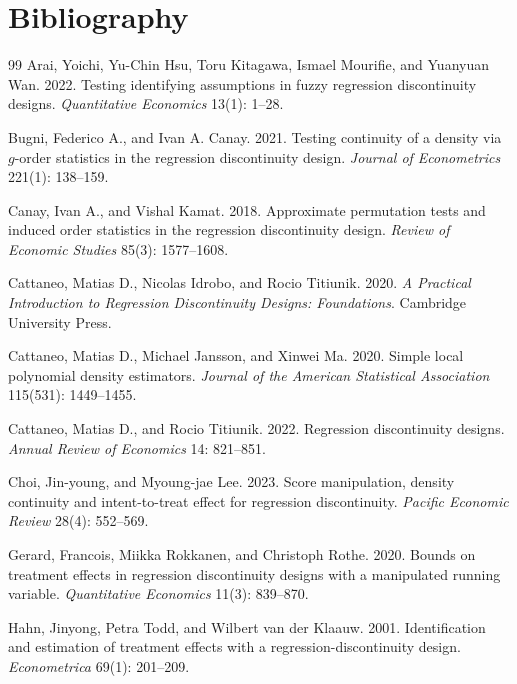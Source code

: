 \documentclass[11pt]{article}
\theoremstyle{definition}
\theoremstyle{plain}
\theoremstyle{remark}
\begin{document}
\section*{Bibliography}
\begin{thebibliography}{99}
Arai, Yoichi, Yu-Chin Hsu, Toru Kitagawa, Ismael Mourifie, and Yuanyuan Wan.
2022.
Testing identifying assumptions in fuzzy regression discontinuity designs.
\emph{Quantitative Economics} 13(1): 1--28.

Bugni, Federico A., and Ivan A. Canay.
2021.
Testing continuity of a density via \(g\)-order statistics in the regression discontinuity design.
\emph{Journal of Econometrics} 221(1): 138--159.

Canay, Ivan A., and Vishal Kamat.
2018.
Approximate permutation tests and induced order statistics in the regression discontinuity design.
\emph{Review of Economic Studies} 85(3): 1577--1608.

Cattaneo, Matias D., Nicolas Idrobo, and Rocio Titiunik.
2020.
\emph{A Practical Introduction to Regression Discontinuity Designs: Foundations}.
Cambridge University Press.

Cattaneo, Matias D., Michael Jansson, and Xinwei Ma.
2020.
Simple local polynomial density estimators.
\emph{Journal of the American Statistical Association} 115(531): 1449--1455.

Cattaneo, Matias D., and Rocio Titiunik.
2022.
Regression discontinuity designs.
\emph{Annual Review of Economics} 14: 821--851.

Choi, Jin-young, and Myoung-jae Lee.
2023.
Score manipulation, density continuity and intent-to-treat effect for regression discontinuity.
\emph{Pacific Economic Review} 28(4): 552--569.

Gerard, Francois, Miikka Rokkanen, and Christoph Rothe.
2020.
Bounds on treatment effects in regression discontinuity designs with a manipulated running variable.
\emph{Quantitative Economics} 11(3): 839--870.

Hahn, Jinyong, Petra Todd, and Wilbert van der Klaauw.
2001.
Identification and estimation of treatment effects with a regression-discontinuity design.
\emph{Econometrica} 69(1): 201--209.


\end{thebibliography}
\end{document}
